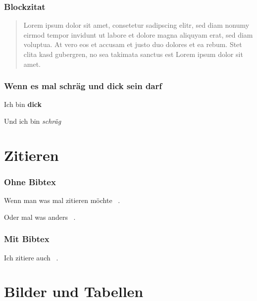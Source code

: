 \begin{frame}

\frametitle{Blockzitat}
\label{blockzitat}

\begin{quote}

Lorem ipsum dolor sit amet, consetetur sadipscing elitr, sed diam nonumy eirmod tempor invidunt ut labore et dolore magna aliquyam erat, sed diam voluptua. At vero eos et accusam et justo duo dolores et ea rebum. Stet clita kasd gubergren, no sea takimata sanctus est Lorem ipsum dolor sit amet. 
\end{quote}

\end{frame}

\begin{frame}

\frametitle{Wenn es mal schräg und dick sein darf}
\label{wennesmalschrgunddickseindarf}

Ich bin \textbf{dick}

Und ich bin \emph{schräg}

\end{frame}

\section{Zitieren}
\label{zitieren}

\begin{frame}

\frametitle{Ohne Bibtex}
\label{ohnebibtex}

Wenn man was mal zitieren möchte ~\citep{Doe}.

Oder mal was anders ~\citep{Johnson}.

\end{frame}

\begin{frame}

\frametitle{Mit Bibtex}
\label{mitbibtex}

Ich zitiere auch ~\citep{Wickens}. 

\end{frame}

\section{Bilder und Tabellen}
\label{bilderundtabellen}


